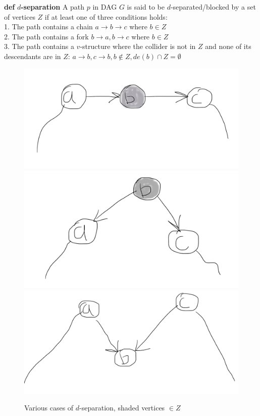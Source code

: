 \documentclass[fleqn]{article}
\def\define#1{\textbf{def} \textbf{#1}}
\numberwithin{equation}{section}
\numberwithin{theorem}{section}
\numberwithin{figure}{section}
\numberwithin{lemma}{section}
\numberwithin{corollary}{section}
\begin{document}
	\define{$d$-separation} A path $p$ in DAG $G$ is said to be $d$-separated/blocked by a set of vertices $Z$ if at least one of three conditions holds:\\
	1. The path contains a chain $a\to b\to c$ where $b\in Z$\\
	2. The path contains a fork $b\to a, b\to c$ where $b\in Z$\\
	3. The path contains a $v$-structure where the collider is not in $Z$ and none of its descendants are in $Z$: $a\to b, c\to b, b \notin Z, de(b) \cap Z = \emptyset$
	
	\begin{figure}[h]
		\begin{center}
			\includegraphics[scale=0.07]{imgs/img4.png}
			\includegraphics[scale=0.07]{imgs/img5.png}
			\includegraphics[scale=0.08]{imgs/img6.png}
		\end{center}
		\caption{Various cases of $d$-separation, shaded vertices $\in Z$}
		\label{fig:dsep1}
	\end{figure}
	
\end{document}
